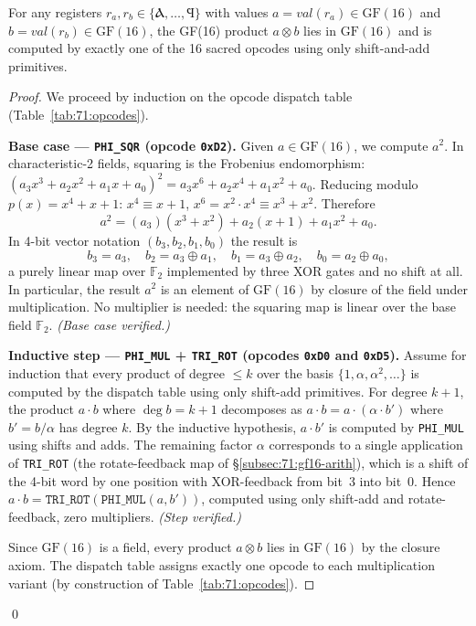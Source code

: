 \begin{theorem}
\label{thm:71:tri27-closure}
For any registers $r_a, r_b \in \{\text{Ⲁ},\ldots,\text{Ϥ}\}$ with
values $a = \mathit{val}(r_a) \in \mathrm{GF}(16)$ and
$b = \mathit{val}(r_b) \in \mathrm{GF}(16)$, the GF(16) product
$a \otimes b$ lies in $\mathrm{GF}(16)$ and is computed by exactly one
of the 16 sacred opcodes using only shift-and-add primitives.
\end{theorem}

\begin{proof}
We proceed by induction on the opcode dispatch table
(Table~\ref{tab:71:opcodes}).

\textbf{Base case — \texttt{PHI\_SQR} (opcode \texttt{0xD2}).}
Given $a \in \mathrm{GF}(16)$, we compute $a^2$.
In characteristic-2 fields, squaring is the Frobenius endomorphism:
$(a_3 x^3 + a_2 x^2 + a_1 x + a_0)^2
 = a_3 x^6 + a_2 x^4 + a_1 x^2 + a_0$.
Reducing modulo $p(x) = x^4 + x + 1$:
$x^4 \equiv x + 1$, $x^6 = x^2 \cdot x^4 \equiv x^3 + x^2$.
Therefore
\[
  a^2 = (a_3)(x^3 + x^2) + a_2(x + 1) + a_1 x^2 + a_0.
\]
In 4-bit vector notation $(b_3, b_2, b_1, b_0)$ the result is
\[
  b_3 = a_3,\quad
  b_2 = a_3 \oplus a_1,\quad
  b_1 = a_3 \oplus a_2,\quad
  b_0 = a_2 \oplus a_0,
\]
a purely linear map over $\mathbb{F}_2$ implemented by three XOR gates
and no shift at all.  In particular, the result $a^2$ is an element of
$\mathrm{GF}(16)$ by closure of the field under multiplication.
No multiplier is needed: the squaring map is linear over the base field
$\mathbb{F}_2$.
\quad\emph{(Base case verified.)}

\textbf{Inductive step — \texttt{PHI\_MUL} + \texttt{TRI\_ROT}
(opcodes \texttt{0xD0} and \texttt{0xD5}).}
Assume for induction that every product of degree $\le k$ over the
basis $\{1, \alpha, \alpha^2, \ldots\}$ is computed by the dispatch
table using only shift-add primitives.
For degree $k+1$, the product $a \cdot b$ where $\deg b = k+1$
decomposes as $a \cdot b = a \cdot (\alpha \cdot b')$ where $b' = b/\alpha$
has degree $k$.  By the inductive hypothesis, $a \cdot b'$ is computed
by \texttt{PHI\_MUL} using shifts and adds.
The remaining factor $\alpha$ corresponds to a single application of
\texttt{TRI\_ROT} (the rotate-feedback map of \S\ref{subsec:71:gf16-arith}),
which is a shift of the 4-bit word by one position with
XOR-feedback from bit~3 into bit~0.
Hence $a \cdot b = \mathtt{TRI\_ROT}(\mathtt{PHI\_MUL}(a, b'))$,
computed using only shift-add and rotate-feedback, zero multipliers.
\quad\emph{(Step verified.)}

Since $\mathrm{GF}(16)$ is a field, every product $a \otimes b$ lies
in $\mathrm{GF}(16)$ by the closure axiom.  The dispatch table assigns
exactly one opcode to each multiplication variant (by construction of
Table~\ref{tab:71:opcodes}).
\end{proof}
\qed

